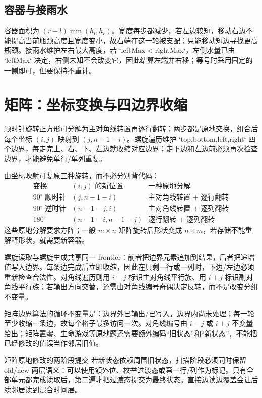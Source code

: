 \documentclass[UTF8,fontset=none,11pt,a4paper]{ctexart}
\begin{document}
\subsection{容器与接雨水}

容器面积为 $(r-l)\min(h_l,h_r)$。宽度每步都减少，若左边较短，移动右边不能提高当前瓶颈高度且宽度变小，故右端在这一轮被支配；只能移动短边寻找更高瓶颈。接雨水维护左右最大高度，若 `leftMax < rightMax`，左侧水量已由 `leftMax` 决定，右侧未知不会改变它，因此结算左端并右移；等号时采用固定的一侧即可，但要保持不重计。

\section{矩阵：坐标变换与四边界收缩}

顺时针旋转正方形可分解为主对角线转置再逐行翻转；两步都是原地交换，组合后每个坐标 $(i,j)$ 映射到 $(j,n-1-i)$。螺旋遍历维护 `top,bottom,left,right` 四个边界，每走完上、右、下、左边就收缩对应边界；走下边和左边前必须再次检查边界，才能避免单行/单列重复。

由坐标映射可复原三种旋转，而不必分别背代码：
\[
\begin{array}{c|c|c}
\text{变换}&(i,j)\text{ 的新位置}&\text{一种原地分解}\\\hline
90^\circ\text{ 顺时针}&(j,n-1-i)&\text{主对角线转置 + 逐行翻转}\\
90^\circ\text{ 逆时针}&(n-1-j,i)&\text{主对角线转置 + 逐列翻转}\\
180^\circ&(n-1-i,n-1-j)&\text{逐行翻转 + 逐列翻转}
\end{array}
\]
这些原地分解要求方阵；一般 $m\times n$ 矩阵旋转后形状变成 $n\times m$，若存储不能重解释形状，就需要新容器。

螺旋读取与螺旋生成共享同一 frontier：前者把边界元素追加到结果，后者把递增值写入边界。每条边完成后立即收缩，因此在只剩一行或一列时，下边/左边必须重新检查合法性。对角线遍历则用 $i-j$ 标识主对角线平行族、用 $i+j$ 标识副对角线平行族；若输出方向交替，还需由对角线编号奇偶决定反转，而不是改变分组不变量。

矩阵边界算法的循环不变量是：边界外已输出/已写入，边界内尚未处理；每一轮至少收缩一条边，故每个格子最多访问一次。对角线编号由 $i-j$ 或 $i+j$ 不变量给出；矩阵置零、生命游戏等原地题还需要额外编码“旧状态”和“新状态”，不能把已经修改的值误当作邻居旧值。

\begin{methodbox}{矩阵原地修改的两阶段提交}
若新状态依赖周围旧状态，扫描阶段必须同时保留 old/new 两层语义：可以使用额外位、枚举过渡态或第一行/列作为标记。只有全部单元都完成读取后，第二遍才把过渡态提交为最终状态。直接边读边覆盖会让后续邻居读到混合时间层。
\end{methodbox}
\end{document}
